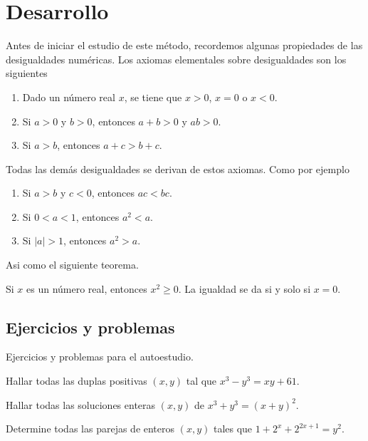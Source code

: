 \section{Desarrollo}

Antes de iniciar el estudio de este método, recordemos algunas propiedades de las desigualdades numéricas.
Los axiomas elementales sobre desigualdades son los siguientes

\begin{enumerate}
    \item Dado un número real $x$, se tiene que $x > 0$, $x = 0$ o $x < 0$.
    \item Si $a > 0$ y $b > 0$, entonces $a + b > 0$ y $ab > 0$.
    \item Si $a > b$, entonces $a + c > b + c$.
\end{enumerate}
Todas las demás desigualdades se derivan de estos axiomas.
Como por ejemplo
    \begin{enumerate}
        \item Si $a > b$ y $c < 0$, entonces $ac < bc$.
        \item Si $0 < a < 1$, entonces $a^2 < a$.
        \item Si $|a| > 1$, entonces $a^2 > a$.
    \end{enumerate}
Asi como el siguiente teorema.
\begin{theorem}
    Si $x$ es un número real, entonces $x^2 \geq 0$.
    La igualdad se da si y solo si $x = 0$.
\end{theorem}


\subsection{Ejercicios y problemas}

Ejercicios y problemas para el autoestudio.

\begin{exercise}
    Hallar todas las duplas positivas $(x,y)$ tal que $x^3 - y^3 = xy + 61$.
\end{exercise}

\begin{exercise}
    Hallar todas las soluciones enteras $(x,y)$ de $x^3 + y^3 = (x + y)^2$.
\end{exercise}

\begin{exercise}
    Determine todas las parejas de enteros $(x, y)$ tales que $1 + 2^x + 2^{2x + 1} = y^2$.
\end{exercise}

